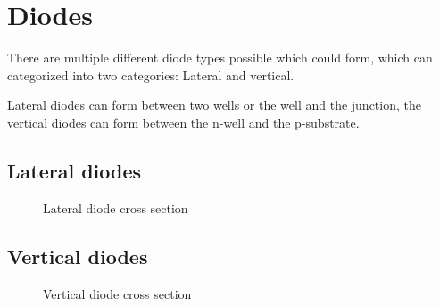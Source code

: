 \section{Diodes}
There are multiple different diode types possible which could form, which can categorized into two categories: Lateral and vertical.

Lateral diodes can form between two wells or the well and the junction, the vertical diodes can form between the n-well and the p-substrate.

\subsection{Lateral diodes}

\begin{figure}[H]
	\centering
	\begin{tikzpicture}[node distance = 3cm, auto, thick,scale=0.5, every node/.style={transform shape}]
		
	\end{tikzpicture}
	\caption{Lateral diode cross section}
	\label{lateral_diode_cross_section}
\end{figure}

\subsection{Vertical diodes}

\begin{figure}[H]
	\centering
	\begin{tikzpicture}[node distance = 3cm, auto, thick,scale=0.5, every node/.style={transform shape}]
		
	\end{tikzpicture}
	\caption{Vertical diode cross section}
	\label{vertical_diode_cross_section}
\end{figure}
